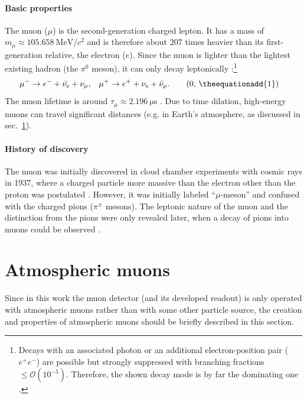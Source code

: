 \paragraph{Basic properties}
The muon ($\mu$) is the second-generation charged lepton. It has a mass of $m_\mu\approx\SI{105.658}{\mega\electronvolt/c^2}$ and is therefore about $207$ times heavier than its first-generation relative, the electron ($e$). Since the muon is lighter than the lightest existing hadron (the $\pi^0$ meson), it can only decay leptonically \cite{PDG2024}:\footnote{Decays with an associated photon or an additional electron-position pair ($e^+e^-$) are possible but strongly suppressed with branching fractions $\leq\mathcal{O}(10^{-5})$. Therefore, the shown decay mode is by far the dominating one \cite{PDG2024}.}
\begin{align}
    \mu^- &\rightarrow e^- + \bar{\nu_e} + \nu_\mu,
    &
    \mu^+ &\rightarrow e^+ + \nu_e + \bar{\nu}_\mu.
\tag{\theequation, \theequationadd{1}}
\end{align}
 \hspace{-0.7em}
The muon lifetime is around $\tau_\mu\approx\SI{2.196}{\micro\second}$ \cite{PDG2024}. Due to time dilation, high-energy muons can travel significant distances (e.g. in Earth's atmosphere, as discussed in sec.\ \ref{sec:AtmosphericMuons}).
\paragraph{History of discovery}
The muon was initially discovered in cloud chamber experiments with cosmic rays in 1937, where a charged particle more massive than the electron other than the proton was postulated \cite{MuonDiscovery-Anderson,MuonDiscovery-Street}. However, it was initially labeled \enquote{$\mu$-meson} and confused with the charged pions ($\pi^\pm$ mesons). The leptonic nature of the muon and the distinction from the pions were only revealed later, when a decay of pions into muons could be observed \cite{MuonDiscovery-Lee}.


\FloatBarrier
\section{Atmospheric muons}
\label{sec:AtmosphericMuons}
Since in this work the muon detector (and its developed readout) is only operated with atmospheric muons rather than with some other particle source, the creation and properties of atmospheric muons should be briefly described in this section.

